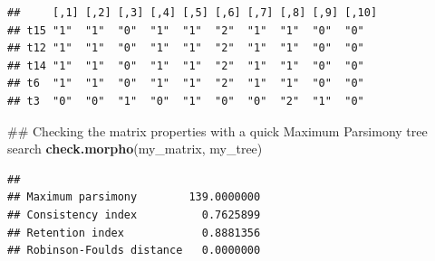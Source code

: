\documentclass[]{book}
\newenvironment{Shaded}{\begin{snugshade}}{\end{snugshade}}
\newcommand{\KeywordTok}[1]{\textcolor[rgb]{0.13,0.29,0.53}{\textbf{#1}}}
\newcommand{\DataTypeTok}[1]{\textcolor[rgb]{0.13,0.29,0.53}{#1}}
\newcommand{\DecValTok}[1]{\textcolor[rgb]{0.00,0.00,0.81}{#1}}
\newcommand{\FloatTok}[1]{\textcolor[rgb]{0.00,0.00,0.81}{#1}}
\newcommand{\StringTok}[1]{\textcolor[rgb]{0.31,0.60,0.02}{#1}}
\newcommand{\OtherTok}[1]{\textcolor[rgb]{0.56,0.35,0.01}{#1}}
\newcommand{\OperatorTok}[1]{\textcolor[rgb]{0.81,0.36,0.00}{\textbf{#1}}}
\newcommand{\NormalTok}[1]{#1}
\theoremstyle{definition}
\theoremstyle{definition}
\theoremstyle{remark}
\begin{document}
\begin{Shaded}
\end{Shaded}

\begin{verbatim}
##     [,1] [,2] [,3] [,4] [,5] [,6] [,7] [,8] [,9] [,10]
## t15 "1"  "1"  "0"  "1"  "1"  "2"  "1"  "1"  "0"  "0"  
## t12 "1"  "1"  "0"  "1"  "1"  "2"  "1"  "1"  "0"  "0"  
## t14 "1"  "1"  "0"  "1"  "1"  "2"  "1"  "1"  "0"  "0"  
## t6  "1"  "1"  "0"  "1"  "1"  "2"  "1"  "1"  "0"  "0"  
## t3  "0"  "0"  "1"  "0"  "1"  "0"  "0"  "2"  "1"  "0"
\end{verbatim}

\begin{Shaded}
\begin{Highlighting}[]
\NormalTok{## Checking the matrix properties with a quick Maximum Parsimony tree search}
\KeywordTok{check.morpho}\NormalTok{(my_matrix, my_tree)}
\end{Highlighting}
\end{Shaded}

\begin{verbatim}
##                                     
## Maximum parsimony        139.0000000
## Consistency index          0.7625899
## Retention index            0.8881356
## Robinson-Foulds distance   0.0000000
\end{verbatim}
\end{document}
